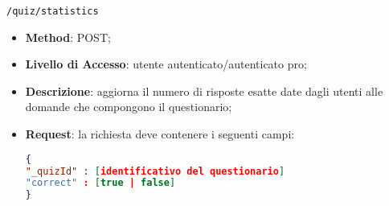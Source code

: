 	\item \texttt{/quiz/statistics}
		\begin{itemize}
			\item \textbf{Method}: POST;
			\item \textbf{Livello di Accesso}: utente autenticato/autenticato pro;
			\item \textbf{Descrizione}: aggiorna il numero di risposte esatte date dagli utenti alle domande che compongono il questionario;
			\item \textbf{Request}: la richiesta deve contenere i seguenti campi:
\begin{lstlisting}[language=json,firstnumber=1]
{
"_quizId" : [identificativo del questionario]
"correct" : [true | false]
}
\end{lstlisting}
\end{itemize}